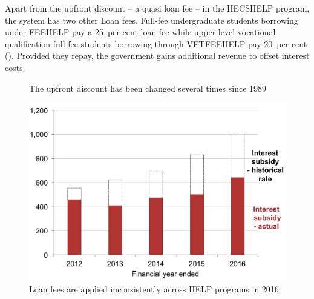 \documentclass[embargoed]{grattan}
\begin{document}
Apart from the upfront discount -- a quasi loan fee -- in the \gls{HECSHELP} program, the system has two other \gls{Loan fees}.
Full-fee undergraduate students borrowing under \gls{FEEHELP} pay a 25~per cent loan fee while upper-level vocational qualification full-fee students borrowing through \gls{VETFEEHELP} pay 20~per cent ().
Provided they repay, the government gains additional revenue to offset interest costs.


\begin{figure}
\begin{minipage}[t][\textheight]{\columnwidth}
\vspace{\grattanfptop}
\caption{The upfront discount has been changed several times since 1989}\label{fig:fig18-the-upfront-discount-has-been-changed-several-times-since-1989}

\includegraphics[page=18]{atlas/Chartpack.pdf}

\end{minipage}
\hfill 
\begin{minipage}[t][\textheight]{\columnwidth}
\vspace{\grattanfptop}
\caption[Loan fees are applied inconsistently across HELP programs in 2016]{\Gls{Loan fees} are applied inconsistently across \gls{HELP} programs in 2016}\label{fig:fig19-loan-fees-are-applied-inconsitently-across-HELP-programs-2016}


\end{minipage}
\end{figure}
\end{document}
